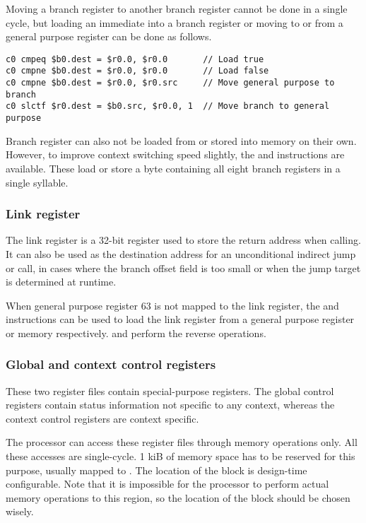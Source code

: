 Moving a branch register to another branch register cannot be done in a single
cycle, but loading an immediate into a branch register or moving to or from a
general purpose register can be done as follows.

\begin{lstlisting}[numbers=none, language=vexasm]
c0 cmpeq $b0.dest = $r0.0, $r0.0       // Load true
c0 cmpne $b0.dest = $r0.0, $r0.0       // Load false
c0 cmpne $b0.dest = $r0.0, $r0.src     // Move general purpose to branch
c0 slctf $r0.dest = $b0.src, $r0.0, 1  // Move branch to general purpose
\end{lstlisting}

Branch register can also not be loaded from or stored into memory on their own.
However, to improve context switching speed slightly, the  and
 instructions are available. These load or store a byte containing
all eight branch registers in a single syllable.

\subsubsection{Link register}
\label{sec:core-ug-isa-regs-lr}

The link register is a 32-bit register used to store the return address when
calling. It can also be used as the destination address for an unconditional
indirect jump or call, in cases where the branch offset field is too small or
when the jump target is determined at runtime.

When general purpose register 63 is not mapped to the link register, the 
 and  instructions can be used to load the link register 
from a general purpose register or memory respectively.  and 
 perform the reverse operations.

\subsubsection{Global and context control registers}
\label{sec:core-ug-isa-regs-creg}

These two register files contain special-purpose registers. The global control
registers contain status information not specific to any context, whereas the
context control registers are context specific.

The processor can access these register files through memory operations only. 
All these accesses are single-cycle. 1 kiB of memory space has to be reserved 
for this purpose, usually mapped to . The 
location of the block is design-time configurable. Note that it is impossible 
for the processor to perform actual memory operations to this region, so the 
location of the block should be chosen wisely.

